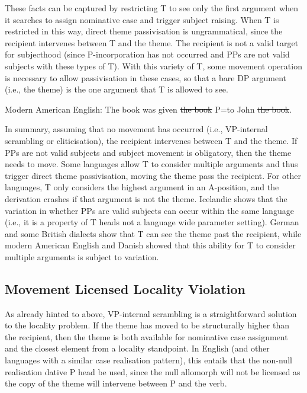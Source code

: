 These facts can be captured by restricting T to see only the first argument when it searches to assign nominative case and trigger subject raising. When T is restricted in this way, direct theme passivisation is ungrammatical, since the recipient intervenes between T and the theme. The recipient is not a valid target for subjecthood (since P-incorporation has not occurred and PPs are not valid subjects with these types of T). With this variety of T, some movement operation is necessary to allow passivisation in these cases, so that a bare DP argument (i.e., the theme) is the one argument that T is allowed to see.  
\begin{exe}
	\ex Modern American English: The book was given \sout{the book} P=to John \sout{the book}.\label{ex:amen-thepass}
\end{exe}

In summary, assuming that no movement has occurred (i.e., VP-internal scrambling or cliticisation), the recipient intervenes between T and the theme. If PPs are not valid subjects and subject movement is obligatory, then the theme needs to move. Some languages allow T to consider multiple arguments and thus trigger direct theme passivisation, moving the theme pass the recipient. For other languages, T only considers the highest argument in an A-position, and the derivation crashes if that argument is not the theme. Icelandic shows that the variation in whether PPs are valid subjects can occur within the same language (i.e., it is a property of T heads not a language wide parameter setting). German and some British dialects show that T can see the theme past the recipient, while modern American English and Danish showed that this ability for T to consider multiple arguments is subject to variation.

\subsection{Movement Licensed Locality Violation}
As already hinted to above, VP-internal scrambling is a straightforward solution to the locality problem. If the theme has moved to be structurally higher than the recipient, then the theme is both available for nominative case assignment and the closest element from a locality standpoint. In English (and other languages with a similar case realisation pattern), this entails that the non-null realisation dative P head be used, since the null allomorph will not be licensed as the copy of the theme will intervene between P and the verb.

